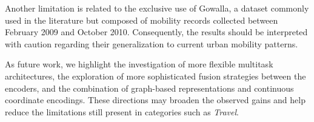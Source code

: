 Another limitation is related to the exclusive use of Gowalla, a dataset commonly used in the literature but composed of mobility records collected between February 2009 and October 2010. Consequently, the results should be interpreted with caution regarding their generalization to current urban mobility patterns.

As future work, we highlight the investigation of more flexible multitask architectures, the exploration of more sophisticated fusion strategies between the encoders, and the combination of graph-based representations and continuous coordinate encodings. These directions may broaden the observed gains and help reduce the limitations still present in categories such as \textit{Travel}.
